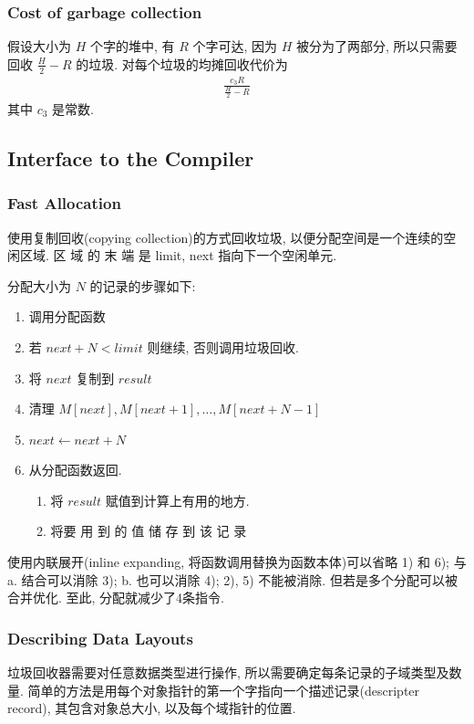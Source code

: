\subsubsection{Cost of garbage collection}
假设大小为 $H$ 个字的堆中, 有 $R$ 个字可达, 因为 $H$ 被分为了两部分, 所以只需要回收 $\frac{H}{2}-R$ 的垃圾. 对每个垃圾的均摊回收代价为
\begin{align*}
    \frac{c_3R}{\frac{H}{2}-R}
\end{align*}
其中 $c_3$ 是常数. 


\subsection{Interface to the Compiler}

\subsubsection{Fast Allocation}
使用复制回收(copying collection)的方式回收垃圾, 以便分配空间是一个连续的空闲区域. 区 域 的 末 端 是 limit, next 指向下一个空闲单元.

分配大小为 $N$ 的记录的步骤如下: 
\begin{enumerate}
    \item 调用分配函数
    \item 若 $next+N<limit$ 则继续, 否则调用垃圾回收.
    \item 将 $next$ 复制到 $result$
    \item 清理 $M[next], M[next+1],\dots,M[next+N-1]$
    \item $next\leftarrow next+N$
    \item 从分配函数返回. 
    \begin{enumerate}
        \item 将 $result$ 赋值到计算上有用的地方.
        \item 将要 用 到 的 值 储 存 到 该 记 录 
    \end{enumerate}
\end{enumerate}

使用内联展开(inline expanding, 将函数调用替换为函数本体)可以省略 1) 和 6); 与 a. 结合可以消除 3); b. 也可以消除 4); 2), 5) 不能被消除. 但若是多个分配可以被合并优化. 至此, 分配就减少了4条指令. 


\subsubsection{Describing Data Layouts}
垃圾回收器需要对任意数据类型进行操作, 所以需要确定每条记录的子域类型及数量. 简单的方法是用每个对象指针的第一个字指向一个描述记录(descripter record), 其包含对象总大小, 以及每个域指针的位置. 

